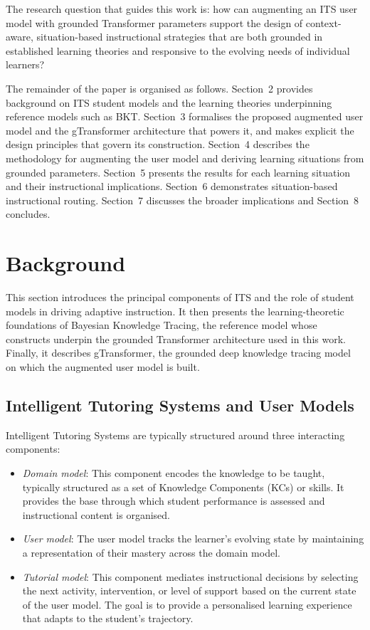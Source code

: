 \documentclass[runningheads]{llncs}
\begin{document}
The research question that guides this work is: how can augmenting an ITS user model with grounded Transformer parameters support the design of context-aware, situation-based instructional strategies that are both grounded in established learning theories and responsive to the evolving needs of individual learners?

The remainder of the paper is organised as follows. Section~2 provides background on ITS student models and the learning theories underpinning reference models such as BKT. Section~3 formalises the proposed augmented user model and the gTransformer architecture that powers it, and makes explicit the design principles that govern its construction. Section~4 describes the methodology for augmenting the user model and deriving learning situations from grounded parameters. Section~5 presents the results for each learning situation and their instructional implications. Section~6 demonstrates situation-based instructional routing. Section~7 discusses the broader implications and Section~8 concludes.

%

\section{Background}

This section introduces the principal components of ITS and the role of student models in driving adaptive instruction. It then presents the learning-theoretic foundations of Bayesian Knowledge Tracing, the reference model whose constructs underpin the grounded Transformer architecture used in this work. Finally, it describes gTransformer, the grounded deep knowledge tracing model on which the augmented user model is built.

\subsection{Intelligent Tutoring Systems and User Models}

Intelligent Tutoring Systems are typically structured around three interacting components:

\begin{itemize}
    \item \textit{Domain model}: This component encodes the knowledge to be taught, typically structured as a set of Knowledge Components (KCs) or skills. It provides the base through which student performance is assessed and instructional content is organised.
    \item \textit{User model}: The user model tracks the learner's evolving state by maintaining a representation of their mastery across the domain model.
    \item \textit{Tutorial model}: This component mediates instructional decisions by selecting the next activity, intervention, or level of support based on the current state of the user model. The goal is to provide a personalised learning experience that adapts to the student's trajectory.
\end{itemize}
\end{document}
